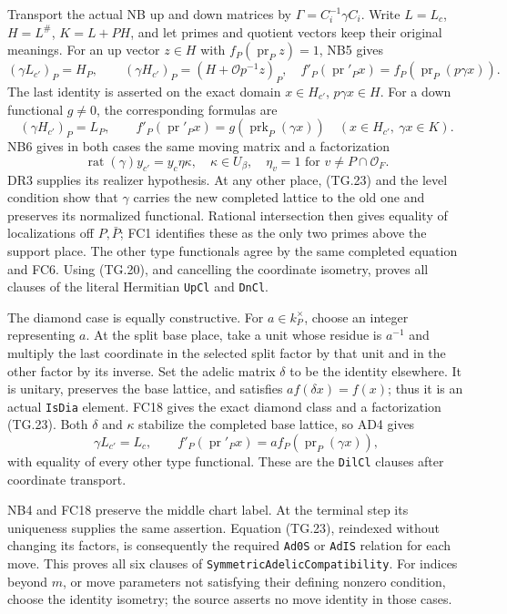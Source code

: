 Transport the actual NB up and down matrices by
$\Gamma=C_i^{-1}\gamma C_i$. Write $L=L_c$, $H=L^{\#}$,
$K=L+PH$, and let primes and quotient vectors keep their
original meanings. For an up vector $z\in H$ with
$f_P(\operatorname{pr}_Pz)=1$, NB5 gives
\[
 (\gamma L_{c'})_P=H_P,\qquad
 (\gamma H_{c'})_P=(H+\mathcal O p^{-1}z)_P,
 \quad f'_{P}(\operatorname{pr}'_P x)
      =f_P(\operatorname{pr}_P(p\gamma x)).
 \tag{TG.21}
\]
The last identity is asserted on the exact domain
$x\in H_{c'}$, $p\gamma x\in H$. For a down functional
$g\ne0$, the corresponding formulas are
\[
 (\gamma H_{c'})_P=L_P,\qquad
 f'_{P}(\operatorname{pr}'_P x)
             =g(\operatorname{prk}_P(\gamma x))
       \quad(x\in H_{c'},\ \gamma x\in K).
 \tag{TG.22}
\]
NB6 gives in both cases the same moving matrix and a factorization
\[
       \operatorname{rat}(\gamma)y_{c'}=y_c\eta\kappa,
       \quad\kappa\in U_\beta,
       \quad\eta_v=1\text{ for }v\ne P\cap\mathcal O_F.
 \tag{TG.23}
\]
DR3 supplies its realizer hypothesis. At any other place,
(TG.23) and the level condition show that $\gamma$ carries the
new completed lattice to the old one and preserves its
normalized functional. Rational intersection then gives equality
of localizations off $P,\bar P$; FC1 identifies these as the
only two primes above the support place. The other type
functionals agree by the same completed equation and FC6.
Using (TG.20), and cancelling the coordinate isometry, proves
all clauses of the literal Hermitian \texttt{UpCl} and
\texttt{DnCl}.

The diamond case is equally constructive. For $a\in k_P^\times$,
choose an integer representing $a$. At the split base place,
take a unit whose residue is $a^{-1}$ and multiply the last
coordinate in the selected split factor by that unit and in
the other factor by its inverse. Set the adelic matrix $\delta$
to be the identity elsewhere. It is unitary, preserves the base
lattice, and satisfies $a f(\delta x)=f(x)$; thus it is an
actual \texttt{IsDia} element. FC18 gives the exact diamond
class and a factorization (TG.23). Both $\delta$ and $\kappa$
stabilize the completed base lattice, so AD4 gives
\[
 \gamma L_{c'}=L_c,\qquad
 f'_{P}(\operatorname{pr}'_P x)
        =a f_P(\operatorname{pr}_P(\gamma x)),
 \tag{TG.24}
\]
with equality of every other type functional. These are the
\texttt{DilCl} clauses after coordinate transport.

NB4 and FC18 preserve the middle chart label. At the terminal
step its uniqueness supplies the same assertion. Equation
(TG.23), reindexed without changing its factors, is consequently
the required \texttt{Ad0S} or \texttt{AdIS} relation for each
move. This proves all six clauses of
\texttt{SymmetricAdelicCompatibility}. For indices beyond $m$,
or move parameters not satisfying their defining nonzero
condition, choose the identity isometry; the source asserts no
move identity in those cases.

